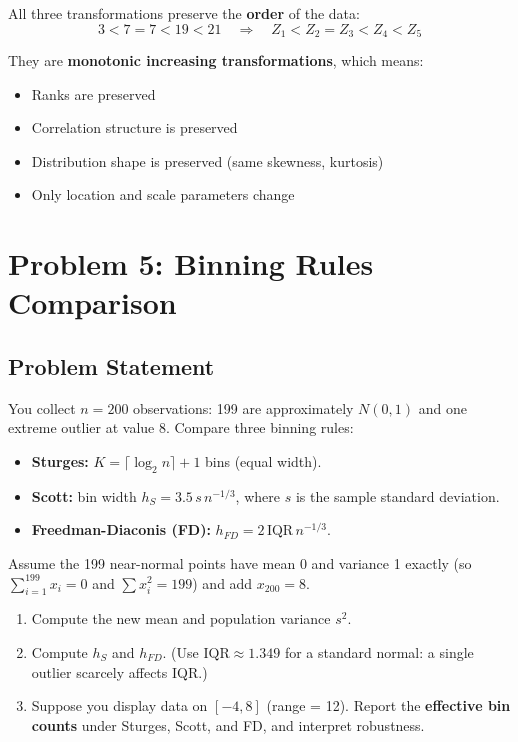 \documentclass[12pt]{article}
\begin{document}
\begin{explanation}
All three transformations preserve the \textbf{order} of the data:
\[
3 < 7 = 7 < 19 < 21 \quad \Rightarrow \quad Z_1 < Z_2 = Z_3 < Z_4 < Z_5
\]

They are \textbf{monotonic increasing transformations}, which means:
\begin{itemize}
    \item Ranks are preserved
    \item Correlation structure is preserved
    \item Distribution shape is preserved (same skewness, kurtosis)
    \item Only location and scale parameters change
\end{itemize}
\end{explanation}

\section{Problem 5: Binning Rules Comparison}

\subsection{Problem Statement}

You collect \(n=200\) observations: 199 are approximately \(N(0,1)\) and one extreme outlier at value 8. Compare three binning rules:

\begin{itemize}
\item \textbf{Sturges:} \(K=\lceil\log_{2}n\rceil+1\) bins (equal width).
\item \textbf{Scott:} bin width \(h_{S}=3.5\,s\,n^{-1/3}\), where \(s\) is the sample standard deviation.
\item \textbf{Freedman-Diaconis (FD):} \(h_{FD}=2\,\mathrm{IQR}\,n^{-1/3}\).
\end{itemize}

Assume the 199 near-normal points have mean 0 and variance 1 exactly (so \(\sum_{i=1}^{199}x_{i}=0\) and \(\sum x_{i}^{2}=199\)) and add \(x_{200}=8\).

\begin{enumerate}
\item[(a)] Compute the new mean and population variance \(s^{2}\).
\item[(b)] Compute \(h_{S}\) and \(h_{FD}\). (Use \(\mathrm{IQR}\approx 1.349\) for a standard normal: a single outlier scarcely affects IQR.)
\item[(c)] Suppose you display data on \([-4,8]\) (range = 12). Report the \textbf{effective bin counts} under Sturges, Scott, and FD, and interpret robustness.
\end{enumerate}
\end{document}
